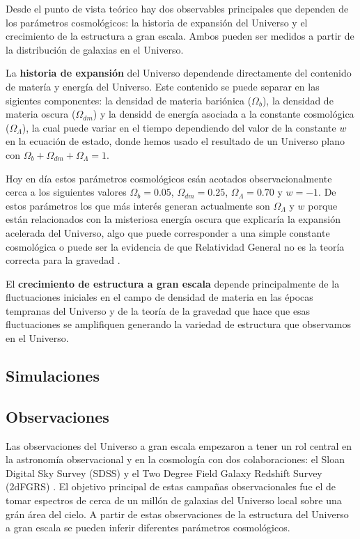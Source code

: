 \documentclass[12pt]{article}
\begin{document}
Desde el punto de vista te\'orico hay dos observables principales que
dependen de los par\'ametros cosmol\'ogicos: la historia de
expansi\'on del Universo y el crecimiento de la estructura a gran
escala. Ambos pueden ser medidos a partir de la distribuci\'on de
galaxias en el Universo.

La {\bf historia de expansi\'on} del Universo dependende directamente del
contenido de mater\'ia y energ\'ia del Universo. Este contenido se
puede separar en las sigientes componentes: la densidad de materia
bari\'onica ($\Omega_b$), la densidad de materia oscura
($\Omega_{dm}$) y la densidd de energ\'ia asociada a la constante
cosmol\'ogica ($\Omega_{\Lambda}$), la cual puede variar en el tiempo
dependiendo del valor de la constante $w$ en la ecuaci\'on de
estado, donde hemos usado el resultado de un Universo plano con $\Omega_b+\Omega_{dm}+\Omega_{\Lambda}=1$.

Hoy en d\'ia estos par\'ametros cosmol\'ogicos es\'an
acotados observacionalmente cerca a los siguientes valores $\Omega_b=0.05$,
$\Omega_{dm}=0.25$, $\Omega_{\Lambda}=0.70$ y $w=-1$. De estos
par\'ametros los que m\'as inter\'es generan actualmente son
$\Omega_\Lambda$ y $w$ porque est\'an relacionados con la misteriosa
energ\'ia oscura que explicar\'ia la expansi\'on acelerada del
Universo, algo que puede corresponder a una simple constante
cosmol\'ogica o puede ser la evidencia de que Relatividad General no
es la teor\'ia correcta para la gravedad 
\cite{2014arXiv1401.0046M}.

El {\bf crecimiento de estructura a gran escala} depende
principalmente de la fluctuaciones iniciales en el campo de densidad
de materia en las \'epocas tempranas del Universo y de la teor\'ia de
la gravedad que hace que esas fluctuaciones se amplifiquen generando
la variedad de estructura que observamos en el Universo.




\subsection{Simulaciones}


\subsection{Observaciones}

Las observaciones del Universo a gran escala empezaron a tener un rol
central en la astronom\'ia observacional y en la cosmolog\'ia con dos
colaboraciones: el Sloan Digital Sky Survey (SDSS) \cite{SDSS} y el Two Degree
Field Galaxy Redshift Survey (2dFGRS) \cite{2dF}. El objetivo
principal de estas campa\~nas observacionales fue el de tomar
espectros de cerca de un mill\'on de galaxias del Universo local sobre
una gr\'an \'area del cielo. A partir de estas observaciones de la
estructura del Universo a gran escala se pueden inferir diferentes
par\'ametros cosmol\'ogicos.
\end{document}
